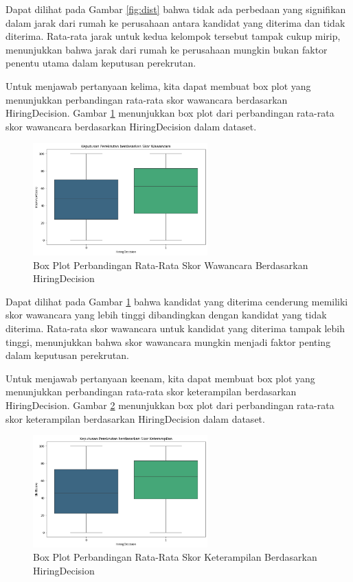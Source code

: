 Dapat dilihat pada Gambar \ref{fig:dist} bahwa tidak ada perbedaan yang signifikan dalam jarak dari rumah ke perusahaan antara kandidat yang diterima dan tidak diterima. Rata-rata jarak untuk kedua kelompok tersebut tampak cukup mirip, menunjukkan bahwa jarak dari rumah ke perusahaan mungkin bukan faktor penentu utama dalam keputusan perekrutan.

Untuk menjawab pertanyaan kelima, kita dapat membuat box plot yang menunjukkan perbandingan rata-rata skor wawancara berdasarkan HiringDecision. Gambar \ref{fig:interview} menunjukkan box plot dari perbandingan rata-rata skor wawancara berdasarkan HiringDecision dalam dataset.

\begin{figure}[H]
    \centering
    \includegraphics[width=0.6\textwidth]{gambar/interview.png}
    \caption{Box Plot Perbandingan Rata-Rata Skor Wawancara Berdasarkan HiringDecision}
    \label{fig:interview}
\end{figure}

Dapat dilihat pada Gambar \ref{fig:interview} bahwa kandidat yang diterima cenderung memiliki skor wawancara yang lebih tinggi dibandingkan dengan kandidat yang tidak diterima. Rata-rata skor wawancara untuk kandidat yang diterima tampak lebih tinggi, menunjukkan bahwa skor wawancara mungkin menjadi faktor penting dalam keputusan perekrutan.

Untuk menjawab pertanyaan keenam, kita dapat membuat box plot yang menunjukkan perbandingan rata-rata skor keterampilan berdasarkan HiringDecision. Gambar \ref{fig:skill} menunjukkan box plot dari perbandingan rata-rata skor keterampilan berdasarkan HiringDecision dalam dataset.

\begin{figure}[H]
    \centering
    \includegraphics[width=0.6\textwidth]{gambar/skill.png}
    \caption{Box Plot Perbandingan Rata-Rata Skor Keterampilan Berdasarkan HiringDecision}
    \label{fig:skill}
\end{figure}

